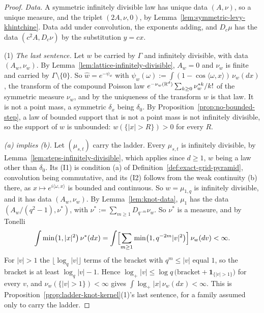 \begin{proof}
\leanok
{}
\emph{Data.} A symmetric infinitely divisible law has unique \Levy{} data $(A, \nu)$, so a unique
\Levy{} measure, and the triplet $(2A, \nu, 0)$, by Lemma~\ref{lem:symmetric-levy-khintchine}.
Data add under convolution, the exponents adding, and $D_c\mu$ has the data $(c^2A, D_c\nu)$ by the
substitution $y = cx$.

(1) \emph{The last sentence.} Let $w$ be carried by $\Gamma$ and infinitely divisible, with data
$(A_w, \nu_w)$. By
Lemma~\ref{lem:lattice-infinitely-divisible}, $A_w = 0$ and $\nu_w$ is finite and carried by
$\Gamma \setminus \{0\}$. So $\widehat w = e^{-\psi_w}$ with $\psi_w(\omega) := \int(1 -
\cos\langle\omega, x\rangle)\,\nu_w(dx)$, the transform of the compound Poisson law
$e^{-\nu_w(\mathbb{R}^d)}\sum_{k \ge 0}\nu_w^{*k}/k!$ of the symmetric measure $\nu_w$, and by the uniqueness
of the transform $w$ is that law. It is not a point mass, a symmetric $\delta_x$ being $\delta_0$.
By Proposition~\ref{prop:no-bounded-step}, a law of bounded support that is not a point mass is not
infinitely divisible, so the support of $w$ is unbounded: $w(\{|x| > R\}) > 0$ for every $R$.

\emph{(a) implies (b).} Let $(\mu_{s,t})$ carry the ladder. Every $\mu_{s,t}$ is infinitely
divisible, by Lemma~\ref{lem:steps-infinitely-divisible}, which applies since $d \ge 1$, $w$ being
a law other than $\delta_0$. Its (I1) is condition (a) of Definition~\ref{def:exact-grid-pyramid},
convolution being commutative, and its (I2) follows from the weak continuity (b) there, as
$x \mapsto e^{i\langle\omega, x\rangle}$ is bounded and continuous. So $w = \mu_{1,q}$ is
infinitely divisible, and it has data $(A_w, \nu_w)$. By Lemma~\ref{lem:knot-data}, $\mu_1$ has the
data $(A_w/(q^2 - 1), \nu^*)$, with $\nu^* := \sum_{m \ge 1}D_{q^{-m}}\nu_w$. So $\nu^*$ is a
\Levy{} measure, and by Tonelli
\[
\int\min\bigl(1, |x|^2\bigr)\,\nu^*(dx) = \int\Bigl[\sum_{m \ge 1}\min\bigl(1,
q^{-2m}|v|^2\bigr)\Bigr]\,\nu_w(dv) < \infty .
\]
For $|v| > 1$ the $\lfloor\log_q|v|\rfloor$ terms of the bracket with $q^m \le |v|$ equal $1$, so
the bracket is at least $\log_q|v| - 1$. Hence
$\log_+|v| \le \log q\,\bigl(\text{bracket} + \mathbf 1_{\{|v| > 1\}}\bigr)$ for every $v$, and
$\nu_w(\{|v| > 1\}) < \infty$ gives $\int\log_+|x|\,\nu_w(dx) < \infty$. This is
Proposition~\ref{prop:ladder-knot-kernel}(1)'s last sentence, for a family assumed only to carry
the ladder.


\end{proof}
